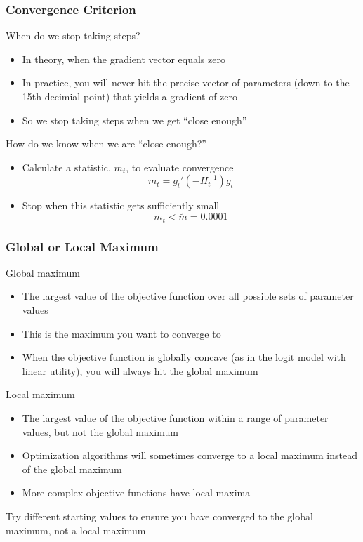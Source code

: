 \documentclass{beamer}\usepackage[]{graphicx}\usepackage[]{color}
\begin{document}
\begin{frame}\frametitle{Convergence Criterion}
    When do we stop taking steps?
    \begin{itemize}
        \item In theory, when the gradient vector equals zero
        \item In practice, you will never hit the precise vector of parameters (down to the 15th decimial point) that yields a gradient of zero
        \item So we stop taking steps when we get ``close enough''
    \end{itemize}
    \vspace{2ex}
    How do we know when we are ``close enough?''
    \begin{itemize}
        \item Calculate a statistic, $m_t$, to evaluate convergence
        $$m_t = g_t' (-H_t^{-1})g_t$$
        \item Stop when this statistic gets sufficiently small
        $$m_t < \breve{m} = 0.0001$$
    \end{itemize}
\end{frame}

\begin{frame}\frametitle{Global or Local Maximum}
    Global maximum
    \begin{itemize}
        \item The largest value of the objective function over all possible sets of parameter values
        \item This is the maximum you want to converge to
        \item When the objective function is globally concave (as in the logit model with linear utility), you will always hit the global maximum
    \end{itemize}
    \vspace{1ex}
    Local maximum
    \begin{itemize}
        \item The largest value of the objective function within a range of parameter values, but not the global maximum
        \item Optimization algorithms will sometimes converge to a local maximum instead of the global maximum
        \item More complex objective functions have local maxima
    \end{itemize}
    \vspace{1ex}
    Try different starting values to ensure you have converged to the global maximum, not a local maximum
\end{frame}
\end{document}
